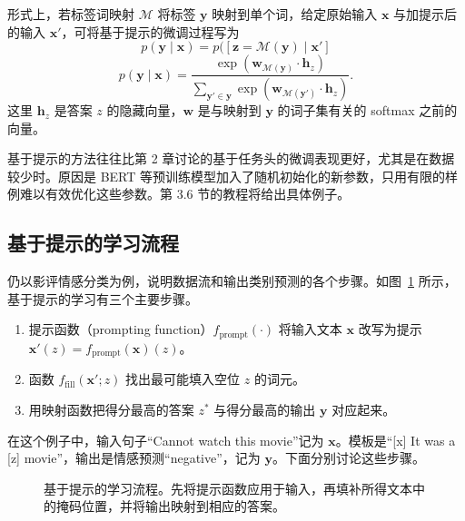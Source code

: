 形式上，若标签词映射 $\mathcal{M}$ 将标签 $\symbf{y}$ 映射到单个词，给定原始输入 $\symbf{x}$ 与加提示后的输入 $\symbf{x}'$，可将基于提示的微调过程写为
\begin{equation}
p(\symbf{y}\mid\symbf{x})=p([\symbf{z}=\mathcal{M}(\symbf{y})\mid\symbf{x}']
\tag{3.1}
\end{equation}
\begin{equation}
p(\symbf{y}\mid\symbf{x})=
\frac{\exp(\symbf{w}_{\mathcal{M}(\symbf{y})}\cdot\symbf{h}_z)}
{\sum_{\symbf{y}'\in\symbf{y}}\exp(\symbf{w}_{\mathcal{M}(\symbf{y}')}\cdot\symbf{h}_z)}.
\tag{3.2}
\end{equation}
这里 $\symbf{h}_z$ 是答案 $z$ 的隐藏向量，$\symbf{w}$ 是与映射到 $\symbf{y}$ 的词子集有关的 softmax 之前的向量。

\begin{practicaltip}
基于提示的方法往往比第 2 章讨论的基于任务头的微调表现更好，尤其是在数据较少时。原因是 BERT 等预训练模型加入了随机初始化的新参数，只用有限的样例难以有效优化这些参数。第 3.6 节的教程将给出具体例子。
\end{practicaltip}

\subsection{基于提示的学习流程}
仍以影评情感分类为例，说明数据流和输出类别预测的各个步骤。如图~\ref{fig:ch03-flow} 所示，基于提示的学习有三个主要步骤。
\begin{enumerate}
\item 提示函数（prompting function）$f_{\mathrm{prompt}}(\cdot)$ 将输入文本 $\symbf{x}$ 改写为提示 $\symbf{x}'(z)=f_{\mathrm{prompt}}(\symbf{x})(z)$。
\item 函数 $f_{\mathrm{fill}}(\symbf{x}';z)$ 找出最可能填入空位 $z$ 的词元。
\item 用映射函数把得分最高的答案 $z^*$ 与得分最高的输出 $\symbf{y}$ 对应起来。
\end{enumerate}
在这个例子中，输入句子“Cannot watch this movie”记为 $\symbf{x}$。模板是“[x] It was a [z] movie”，输出是情感预测“negative”，记为 $\symbf{y}$。下面分别讨论这些步骤。

\begin{figure}[!htbp]
\centering

\caption{基于提示的学习流程。先将提示函数应用于输入，再填补所得文本中的掩码位置，并将输出映射到相应的答案。}
\label{fig:ch03-flow}
\end{figure}

